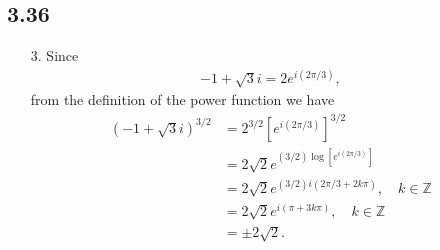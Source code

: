 \documentclass[a4paper,12pt]{article}
\begin{document}
\subsection*{3.36}
\begin{enumerate}
    \item[3.]
        Since
        \begin{align*}
            -1 + \sqrt{3} i = 2e^{i(2\pi/3)},
        \end{align*}
        from the definition of the power function we have
        \begin{align*}
            (-1 + \sqrt{3} i)^{3/2} &= 2^{3/2} \left[ e^{i(2\pi/3)} \right]^{3/2} \\
            &= 2\sqrt{2} e^{(3/2) \log \left[ e^{i(2\pi/3)} \right]} \\
            &= 2\sqrt{2} e^{(3/2) i (2\pi/3 + 2k\pi)}, \quad k \in \mathbb{Z} \\
            &= 2\sqrt{2} e^{i (\pi + 3k\pi)}, \quad k \in \mathbb{Z} \\
            &= \pm 2\sqrt{2}.
        \end{align*}
\end{enumerate}
\end{document}
